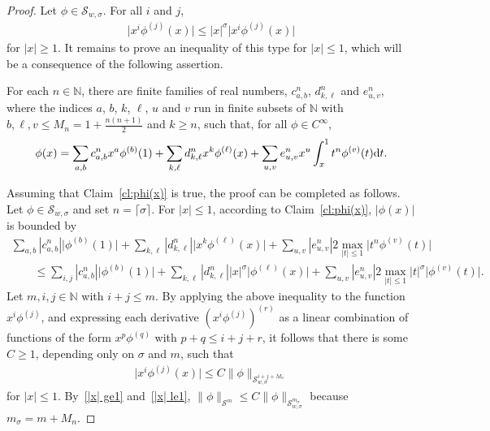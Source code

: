 \documentclass[11pt]{article}
\newcommand{\N}{\mathbb{N}}
\renewcommand{\SS}{\mathcal{S}}
\newcommand{\Cinf}{C^\infty}
\begin{document}
\begin{proof}
  Let $\phi\in\SS_{w,\sigma}$. For all $i$ and $j$,
    \begin{gather}\label{|x| ge1}
      \big|x^i\phi^{(j)}(x)\big|\le |x|^\sigma\big|x^i\phi^{(j)}(x)\big|
    \end{gather}
  for $|x|\ge1$. It remains to prove an inequality of this type for $|x|\le1$, which will be a consequence of the following assertion.

  \begin{claim}\label{cl:phi(x)}
      For each $n\in\N$, there are f\/inite families of real numbers, $c^n_{a,b}$, $d^n_{k,\ell}$ and $e^n_{u,v}$, where the indices $a$, $b$, $k$, $\ell$, $u$ and $v$ run in f\/inite subsets of $\N$ with $b,\ell,v\le M_n=1+\frac{n(n+1)}{2}$ and $k\ge n$, such that, for all $\phi\in\Cinf$,
        \[
          \phi(x)=\sum_{a,b}c^n_{a,b}x^a\phi^{(b)}(1)+\sum_{k,\ell}d^n_{k,\ell}x^k\phi^{(\ell)}(x)
          +\sum_{u,v}e^n_{u,v}x^u\int_x^1t^n\phi^{(v)}(t){\rm d} t .
        \]
    \end{claim}

  Assuming that Claim~\ref{cl:phi(x)} is true, the proof can be completed as follows. Let $\phi\in\SS_{w,\sigma}$ and set $n=\lceil\sigma\rceil$. For $|x|\le1$, according to Claim~\ref{cl:phi(x)}, $|\phi(x)|$ is bounded by
    \begin{gather*}
      \sum_{a,b}|c^n_{a,b}|\big|\phi^{(b)}(1)\big|+\sum_{k,\ell}|d^n_{k,\ell}|\big|x^k\phi^{(\ell)}(x)\big|
       +\sum_{u,v}|e^n_{u,v}| 2\max_{|t|\le1}\big|t^n\phi^{(v)}(t)\big|\\
     \qquad{}  \le\sum_{i,j}|c^n_{a,b}|\big|\phi^{(b)}(1)\big|+\sum_{k,\ell}|d^n_{k,\ell}| |x|^\sigma\big|\phi^{(\ell)}(x)\big|
       +\sum_{u,v}|e^n_{u,v}| 2\max_{|t|\le1}|t|^\sigma\big|\phi^{(v)}(t)\big| .
    \end{gather*}
  Let $m,i,j\in\N$ with $i+j\le m$. By applying the above inequality to the function $x^i\phi^{(j)}$, and expressing each derivative $(x^i\phi^{(j)})^{(r)}$ as a linear combination of functions of the form $x^p\phi^{(q)}$ with $p+q\le i+j+r$, it follows that there is some $C\ge1$, depending only on $\sigma$ and $m$, such that
    \begin{gather}\label{|x| le1}
      \big|x^i\phi^{(j)}(x)\big|\le C \|\phi\|_{\SS_{w,\sigma}^{i+j+M_n}}
    \end{gather}
  for $|x|\le1$. By~\eqref{|x| ge1} and~\eqref{|x| le1}, $\|\phi\|_{\SS^m}\le C \|\phi\|_{\SS_{w,\sigma}^{m_\sigma}}$ because $m_\sigma=m+M_n$.


\end{proof}
\end{document}
